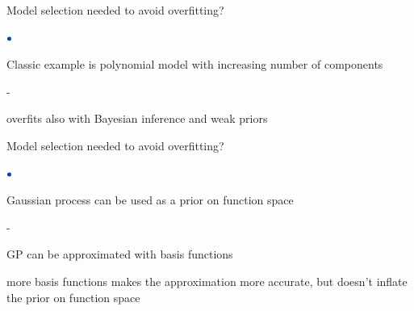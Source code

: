 \documentclass[english,t]{beamer}
\newenvironment{list1}{
   \begin{list}{$\color{list1}\bullet$}{\itemsep=6pt}}{
  \end{list}}
\newenvironment{list2}{
  \begin{list}{-}{\baselineskip=12pt\itemsep=2pt}}{
  \end{list}}
\begin{document}
\begin{frame}{Model selection needed to avoid overfitting?}

\begin{list1}
\item Classic example is polynomial model with increasing number of components
  \begin{list2}
  \item overfits also with Bayesian inference and weak priors
  \end{list2}
\end{list1}
\vspace{-0.5\baselineskip}

\end{frame}

\begin{frame}{Model selection needed to avoid overfitting?}

\begin{list1}
\item Gaussian process can be used as a prior on function space
  \begin{list2}
  \item GP can be approximated with basis functions
  \item<2-> more basis functions makes the approximation more
    accurate, but doesn't inflate the prior on function space
  \end{list2}
\end{list1}
\vspace{-0.5\baselineskip}

\end{frame}
\end{document}
